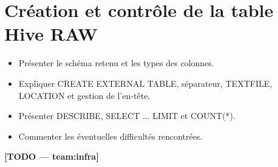 \section{Création et contrôle de la table Hive RAW}
\begin{itemize}
  \item Présenter le schéma retenu et les types des colonnes.
  \item Expliquer CREATE EXTERNAL TABLE, séparateur, TEXTFILE, LOCATION et gestion de l'en-tête.
  \item Présenter DESCRIBE, SELECT ... LIMIT et COUNT(*).
  \item Commenter les éventuelles difficultés rencontrées.
\end{itemize}
\textbf{[TODO — team:infra]}
